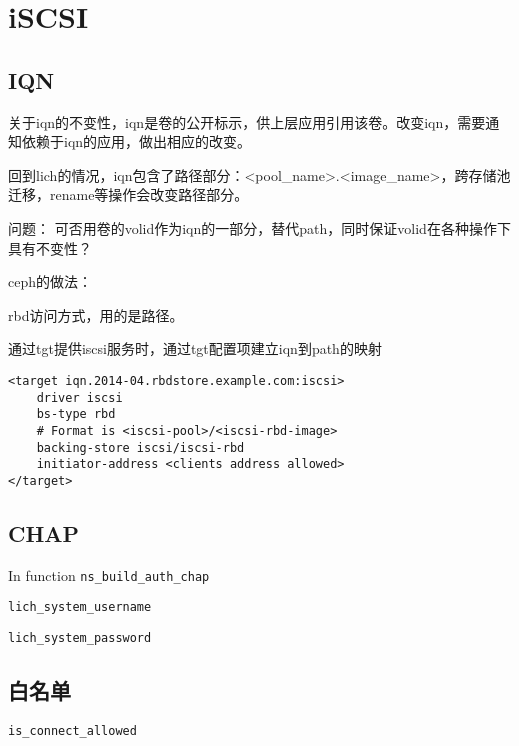 \chapter{iSCSI}

\section{IQN}

关于iqn的不变性，iqn是卷的公开标示，供上层应用引用该卷。改变iqn，需要通知依赖于iqn的应用，做出相应的改变。

回到lich的情况，iqn包含了路径部分：<pool\_name>.<image\_name>，跨存储池迁移，rename等操作会改变路径部分。

问题： 可否用卷的volid作为iqn的一部分，替代path，同时保证volid在各种操作下具有不变性？

ceph的做法：
\begin{compactenum}
\item rbd访问方式，用的是路径。
\item 通过tgt提供iscsi服务时，通过tgt配置项建立iqn到path的映射
\end{compactenum}

\begin{lstlisting}[frame=single]
<target iqn.2014-04.rbdstore.example.com:iscsi>
    driver iscsi
    bs-type rbd
    # Format is <iscsi-pool>/<iscsi-rbd-image>
    backing-store iscsi/iscsi-rbd  
    initiator-address <clients address allowed>
</target>
\end{lstlisting}

\section{CHAP}

In function \verb|ns_build_auth_chap|
\begin{compactitem}
\item \verb|lich_system_username|
\item \verb|lich_system_password|
\end{compactitem}

\section{白名单}

\begin{compactitem}
\item \verb|is_connect_allowed|
\end{compactitem}

